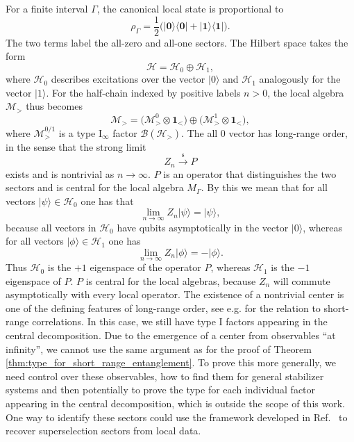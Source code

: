 \documentclass[aps,pra,reprint,superscriptaddress]{revtex4-2}
\newcommand{\LS}[1]{{\textcolor{red}{#1}}}
\newcommand{\AJ}[1]{\textcolor{blue}{#1}}
\newcommand{\cB}{{\mathcal B}}
\newcommand{\cH}{{\mathcal H}}
\newcommand{\cM}{{\mathcal M}}
\newcommand\G{\Gamma}
\newcommand\p{\phi}
\newcommand\y{\psi}
\newcommand{\id}{\mathbf 1}
\providecommand{\ket}[1]{\lvert #1\rangle}
\providecommand{\bra}[1]{\langle #1\rvert}
\theoremstyle{definition}
\theoremstyle{remark}
\begin{document}
For a finite interval $\Gamma$, the canonical local state is proportional to
\begin{equation}
    \rho_\Gamma=\frac12\bigl(\ket{\mathbf0}\!\bra{\mathbf0} +\ket{\mathbf1}\!\bra{\mathbf1}\bigr).
\end{equation}
The two terms label the all-zero and all-one sectors. The Hilbert space takes the form 
\begin{equation}
    \cH = \cH_0 \oplus \cH_1,
\end{equation}
where $\cH_0$ describes excitations over the vector $\ket{0}$ and $\cH_1$ analogously for the vector $\ket{1}$.
For the half-chain
indexed by positive labels $n>0$, the local algebra $\cM_>$ thus becomes
\begin{equation}
    \cM_> = \big( \cM^{0}_> \otimes \id_< \big) \oplus \big( \cM^{1}_> \otimes
        \id_< \big) ,
\end{equation}
where $\cM^{0/1}_>$ is a type I$_\infty$ factor $\cB(\cH_>)$. The all $0$ vector has
long-range order, in the sense that the strong limit
\begin{equation}
    Z_n \xrightarrow{\mathrm{s}} P
\end{equation}
exists and is nontrivial as $n \to \infty$. $P$ is an operator that distinguishes the two sectors and is central for the local algebra
$M_\G$. By this we mean that for all vectors $\ket{\y} \in \cH_0$ one has that 
\begin{equation}
    \lim_{n \to \infty} Z_n \ket{\y} = \ket{\y},
\end{equation}
because all vectors in $\cH_0$ have qubits asymptotically in the vector $\ket{0}$, whereas for all vectors $\ket{\p}\in \cH_1$ one has 
\begin{equation}
    \lim_{n \to \infty} Z_n \ket{\p} = - \ket{\p}.
\end{equation}
Thus $\cH_0$ is the $+1$ eigenspace of the operator $P$, whereas $\cH_1$ is the $-1$ eigenspace of $P$. $P$ is central for the local algebras, because $Z_n$ will commute asymptotically with every local operator. The existence of a nontrivial center is one of the defining features of long-range order, see e.g. \cite{LanfordRuelle1969} for the relation to short-range correlations. In this case, we still have type I factors appearing in the central
decomposition. Due to the emergence of a center from observables ``at infinity'', we cannot use the same argument as for the proof of Theorem \ref{thm:type_for_short_range_entanglement}. To prove this more generally, we need control over these
observables, how to find them for general stabilizer systems and then potentially to prove the type for each individual factor appearing in the central decomposition, which is outside the scope of this work. One way to identify these sectors could use the framework developed in Ref.~\cite{Haah:2013oba} to recover superselection sectors from local data.  
\end{document}
